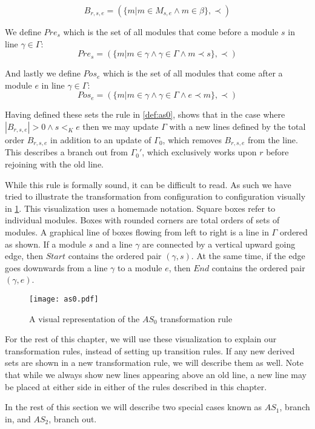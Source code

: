 \[B_{r,s,e} = (\{m |m \in M_{s,e} \land m \in \beta\}, \prec)\]

We define $Pre_{s}$ which is the set of all modules that come before a module $s$ in line $\gamma \in \Gamma$:
\[Pre_{s} = (\{m | m \in \gamma \land \gamma \in \Gamma \land m \prec s\}, \prec)\]

And lastly we define $Pos_{e}$ which is the set of all modules that come after a module $e$  in line $\gamma \in \Gamma$:
\[Pos_{e} = (\{m | m \in \gamma \land \gamma \in \Gamma \land e \prec  m \}, \prec)\]

Having defined these sets the rule in \cref{def:as0}, shows that in the case where $|B_{r,s,e}| > 0 \land s <_K e$ then we may update $\Gamma$ with a new lines defined by the total order $B_{r,s,e}$ in addition to an update of $\Gamma_0$, which removes $B_{r,s,e}$ from the line. This describes a branch out from $\Gamma_0'$, which exclusively works upon $r$ before rejoining with the old line.   

While this rule is formally sound, it can be difficult to read. As such we have tried to illustrate the transformation from configuration to configuration visually in \cref{fig:as0}. This visualization uses a homemade notation. Square boxes refer to individual modules. Boxes with rounded corners are total orders of sets of modules. A graphical line of boxes flowing from left to right is a line in $\Gamma$ ordered as shown. If a module $s$ and a line $\gamma$ are connected by a vertical upward going edge, then $Start$ contains the ordered pair $(\gamma ,s)$. At the same time, if the edge goes downwards from a line $\gamma$ to a module $e$, then $End$ contains the ordered pair $(\gamma ,e)$.


\begin{figure}[H]
\centering
\texttt{[image: as0.pdf]}
\caption{A visual representation of the $AS_0$ transformation rule}
\label{fig:as0}
\end{figure}

For the rest of this chapter, we will use these visualization to explain our transformation rules, instead of setting up transition rules. If any new derived sets are shown in a new transformation rule, we will describe them as well. Note that while we always show new lines appearing above an old line, a new line may be placed at either side in either of the rules described in this chapter.  

In the rest of this section we will describe two special cases known as $AS_1$, branch in, and $AS_2$, branch out. 

